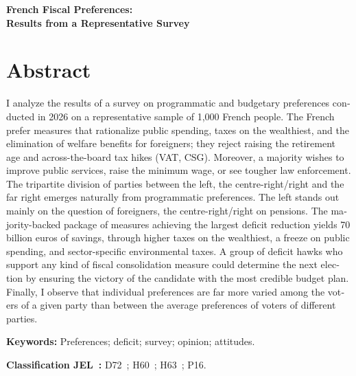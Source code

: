 \documentclass[12pt]{article}
\begin{document}
\clearpage
\begin{otherlanguage}{english}
\begin{center}
  {\Large\bfseries French Fiscal Preferences:\\ Results from a Representative Survey\par}
\end{center}

\section*{Abstract}
I analyze the results of a survey on programmatic and budgetary preferences conducted in 2026 on a representative sample of 1,000 French people. The French prefer measures that rationalize public spending, taxes on the wealthiest, and the elimination of welfare benefits for foreigners; they reject raising the retirement age and across-the-board tax hikes (VAT, CSG). Moreover, a majority wishes to improve public services, raise the minimum wage, or see tougher law enforcement. The tripartite division of parties between the left, the centre-right/right and the far right emerges naturally from programmatic preferences. The left stands out mainly on the question of foreigners, the centre-right/right on pensions. The majority-backed package of measures achieving the largest deficit reduction yields 70 billion euros of savings, through higher taxes on the wealthiest, a freeze on public spending, and sector-specific environmental taxes. A group of deficit hawks who support any kind of fiscal consolidation measure could determine the next election by ensuring the victory of the candidate with the most credible budget plan. Finally, I observe that individual preferences are far more varied among the voters of a given party than between the average preferences of voters of different parties.

\medskip\noindent
\textbf{Keywords:} Preferences; deficit; survey; opinion; attitudes.
\end{otherlanguage}

\bigskip\noindent
\textbf{Classification JEL~:} D72~; H60~; H63~; P16.
\end{document}
